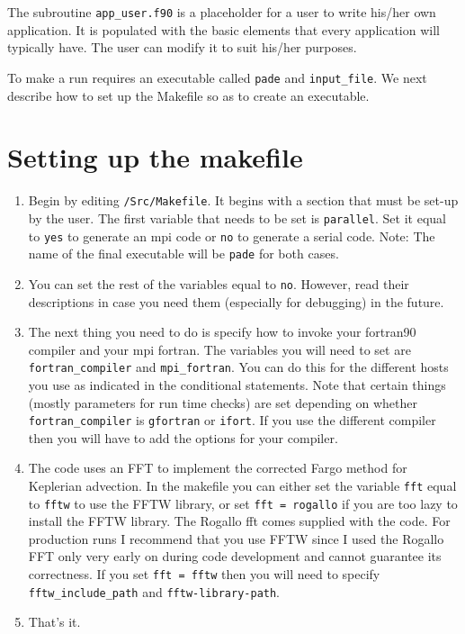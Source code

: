 \documentclass[11pt]{amsart}
\begin{document}
The subroutine {\tt app\_user.f90} is a placeholder for a user to write his/her own application.  It is populated with the basic elements that every application will typically have.  The user can modify it to suit his/her purposes.

To make a run requires an executable called {\tt pade} and {\tt input\_file}.  We next describe how to set up the Makefile so as to create an executable.

\section{Setting up the makefile}

\begin{enumerate}
\item Begin by editing {\tt /Src/Makefile}.  It begins with a section that must be set-up by the user.  The first variable that needs to be set is {\tt parallel}.  Set it equal to {\tt yes} to generate an mpi code or {\tt no} to generate a serial code.  Note: The name of the final executable will be {\tt pade} for both cases.
\item You can set the rest of the variables equal to {\tt no}.  However, read their descriptions in case you need them (especially for debugging) in the future.
\item The next thing you need to do is specify how to invoke your fortran90 compiler and your mpi fortran.  
The variables you will need to set are {\tt fortran\_compiler} and {\tt mpi\_fortran}.
You can do this for the different hosts you use as indicated in the conditional statements.  Note that certain things (mostly parameters for run time checks) are set depending on whether {\tt fortran\_compiler} is {\tt gfortran} or {\tt ifort}.  If you use the different compiler then
you will have to add the options for your compiler.
\item The code uses an FFT to implement the corrected Fargo method for Keplerian advection.
In the makefile you can either set the variable {\tt fft} equal to {\tt fftw} to use the FFTW library, or set {\tt fft = rogallo} if you are too lazy to install the FFTW library.  The Rogallo fft comes supplied with the code.
For production runs I recommend  that you use FFTW since I used the Rogallo FFT only very early on during code development and cannot guarantee its correctness.  If you set {\tt fft = fftw} then you will need to specify {\tt fftw\_include\_path} and {\tt fftw-library-path}.
\item That's it.
\end{enumerate}
\end{document}
